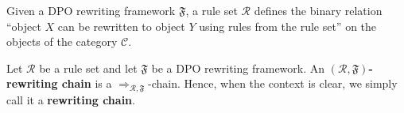 Given a DPO rewriting framework \(\mathfrak{F}\), a rule set \(\mathcal{R}\) defines the binary relation \enquote{object $X$ can be rewritten to object $Y$ using rules from the rule set} on the objects of the category $\mathcal{C}$.
\begin{definition}\label{def:rewriting-chain}
Let \(\mathcal{R}\) be a rule set and let \(\mathfrak{F}\) be a DPO rewriting framework.
An \textbf{\((\mathcal{R},\mathfrak{F})\)-rewriting chain} is a \(\mathop{\Rightarrow}_{\mathcal{R},\mathfrak{F}}\)-chain. Hence, when the context is clear, we simply call it a \textbf{rewriting chain}.
\end{definition}

